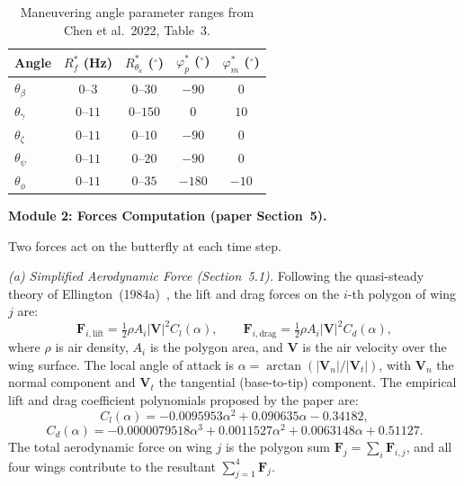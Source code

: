 \documentclass[12pt]{article}
\begin{document}
\begin{table}[H]
\centering\small
\begin{tabular}{|l|c|c|c|c|}
\hline
\textbf{Angle} & $R_f^{*}$ (Hz) & $R_{\theta_a}^{*}$ ($^\circ$)
               & $\varphi_p^{*}$ ($^\circ$) & $\varphi_m^{*}$ ($^\circ$) \\
\hline
$\theta_\beta$  & $0$--$3$   & $0$--$30$  & $-90$  & $0$   \\
$\theta_\gamma$ & $0$--$11$  & $0$--$150$ & $0$    & $10$  \\
$\theta_\zeta$  & $0$--$11$  & $0$--$10$  & $-90$  & $0$   \\
$\theta_\psi$   & $0$--$11$  & $0$--$20$  & $-90$    & $0$   \\
$\theta_\phi$   & $0$--$11$   & $0$--$35$  & $-180$ & $-10$ \\
\hline
\end{tabular}
\caption{Maneuvering angle parameter ranges from Chen et al.\ 2022, Table~3.}
\label{tab:params}
\end{table}

\textbf{Module 2: Forces Computation (paper Section~5).}

Two forces act on the butterfly at each time step.

\textit{(a) Simplified Aerodynamic Force (Section~5.1).}
Following the quasi-steady theory of Ellington~(1984a)~\cite{Ellington1984a},
the lift and drag forces on the $i$-th polygon of wing $j$ are:
\[
  \mathbf{F}_{i,\mathrm{lift}} = \tfrac{1}{2}\rho A_i |\mathbf{V}|^2 C_l(\alpha),
  \qquad
  \mathbf{F}_{i,\mathrm{drag}} = \tfrac{1}{2}\rho A_i |\mathbf{V}|^2 C_d(\alpha),
\]
where $\rho$ is air density, $A_i$ is the polygon area, and $\mathbf{V}$ is the
air velocity over the wing surface. The local angle of attack is
$\alpha = \arctan(|\mathbf{V}_n|/|\mathbf{V}_t|)$,
with $\mathbf{V}_n$ the normal component and $\mathbf{V}_t$ the tangential
(base-to-tip) component. The empirical lift and drag coefficient polynomials
proposed by the paper are:
\[
  C_l(\alpha) = -0.0095953\alpha^2 + 0.090635\alpha - 0.34182,
\]
\[
  C_d(\alpha) = -0.0000079518\alpha^3 + 0.0011527\alpha^2 + 0.0063148\alpha + 0.51127.
\]
The total aerodynamic force on wing $j$ is the polygon sum
$\mathbf{F}_j = \sum_i \mathbf{F}_{i,j}$, and all four wings contribute
to the resultant $\sum_{j=1}^{4}\mathbf{F}_j$.
\end{document}
